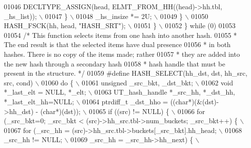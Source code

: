 \begin{DoxyCode}
{{{{{{{{{01046 \textcolor{preprocessor}{        DECLTYPE\_ASSIGN(head, ELMT\_FROM\_HH((head)->hh.tbl, \_hs\_list));           \(\backslash\)}
01047 \textcolor{preprocessor}{      \}                                                                          \(\backslash\)}
01048 \textcolor{preprocessor}{      \_hs\_insize *= 2U;                                                          \(\backslash\)}
01049 \textcolor{preprocessor}{    \}                                                                            \(\backslash\)}
01050 \textcolor{preprocessor}{    HASH\_FSCK(hh, head, "HASH\_SRT");                                             \(\backslash\)}
01051 \textcolor{preprocessor}{  \}                                                                              \(\backslash\)}
01052 \textcolor{preprocessor}{\} while (0)}
01053 
01054 \textcolor{comment}{/* This function selects items from one hash into another hash.}
01055 \textcolor{comment}{ * The end result is that the selected items have dual presence}
01056 \textcolor{comment}{ * in both hashes. There is no copy of the items made; rather}
01057 \textcolor{comment}{ * they are added into the new hash through a secondary hash}
01058 \textcolor{comment}{ * hash handle that must be present in the structure. */}
01059 \textcolor{preprocessor}{#define HASH\_SELECT(hh\_dst, dst, hh\_src, src, cond)                              \(\backslash\)}
01060 \textcolor{preprocessor}{do \{                                                                             \(\backslash\)}
01061 \textcolor{preprocessor}{  unsigned \_src\_bkt, \_dst\_bkt;                                                   \(\backslash\)}
01062 \textcolor{preprocessor}{  void *\_last\_elt = NULL, *\_elt;                                                 \(\backslash\)}
01063 \textcolor{preprocessor}{  UT\_hash\_handle *\_src\_hh, *\_dst\_hh, *\_last\_elt\_hh=NULL;                         \(\backslash\)}
01064 \textcolor{preprocessor}{  ptrdiff\_t \_dst\_hho = ((char*)(&(dst)->hh\_dst) - (char*)(dst));                 \(\backslash\)}
01065 \textcolor{preprocessor}{  if ((src) != NULL) \{                                                           \(\backslash\)}
01066 \textcolor{preprocessor}{    for (\_src\_bkt=0; \_src\_bkt < (src)->hh\_src.tbl->num\_buckets; \_src\_bkt++) \{    \(\backslash\)}
01067 \textcolor{preprocessor}{      for (\_src\_hh = (src)->hh\_src.tbl->buckets[\_src\_bkt].hh\_head;               \(\backslash\)}
01068 \textcolor{preprocessor}{        \_src\_hh != NULL;                                                         \(\backslash\)}
01069 \textcolor{preprocessor}{        \_src\_hh = \_src\_hh->hh\_next) \{                                            \(\backslash\)}
}}}}}}}}}
\end{DoxyCode}
